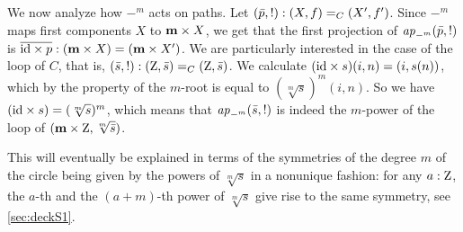 \begin{example}
%

We now analyze how $-^m$ acts on paths. Let $(\bar {p},!):(X,f)=_C(X',f')$.
Since $-^m$ maps first components $X$ to $\mathbf{m}\times X$, we get that
the first projection of $\mathop{{\it ap}_{-^m}}(\bar {p},!)$ is 
$\overline{\mathord{\mathrm{id}}\times p} : (\mathbf{m}\times X) = (\mathbf{m}\times X')$.
We are particularly interested in the case of the loop of $C$, 
that is, $(\bar {s},!):(\mathrm{Z},\bar {s})=_C(\mathrm{Z},\bar {s})$.
We calculate $(\mathord{\mathrm{id}}\times s)(i,n) = (i,s(n))$,
which by the property of the $m$-root is equal to $(\sqrt[m]s)^m(i,n)$.
So we have $(\mathord{\mathrm{id}}\times s)=(\sqrt[m]s)^m$, which means that
$\mathop{{\it ap}_{-^m}}(\bar {s},!)$ is indeed the $m$-power of the
loop of $(\mathbf{m}\times \mathrm{Z},\sqrt[m]{\bar {s}})$.



This will eventually be explained in terms of the symmetries of the 
degree $m$ \covering of the circle being given by the powers of $\sqrt[m]s$ in a 
nonunique fashion: for any $a:\mathrm{Z}$, the $a$-th and the $(a+m)$-th power of 
$\sqrt[m]s$ give rise to the same symmetry, see \cref{sec:deckS1}.


\end{example}
